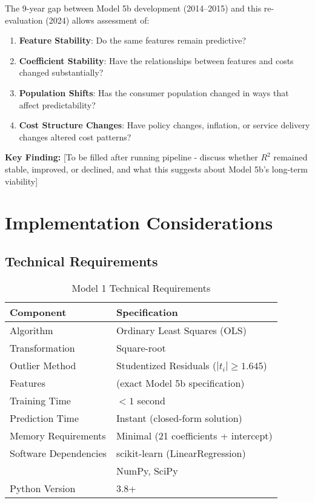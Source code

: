 The 9-year gap between Model 5b development (2014--2015) and this re-evaluation (2024) allows assessment of:

\begin{enumerate}
    \item \textbf{Feature Stability}: Do the same features remain predictive?
    \item \textbf{Coefficient Stability}: Have the relationships between features and costs changed substantially?
    \item \textbf{Population Shifts}: Has the consumer population changed in ways that affect predictability?
    \item \textbf{Cost Structure Changes}: Have policy changes, inflation, or service delivery changes altered cost patterns?
\end{enumerate}

\textbf{Key Finding:} [To be filled after running pipeline - discuss whether $R^2$ remained stable, improved, or declined, and what this suggests about Model 5b's long-term viability]

\section{Implementation Considerations}

\subsection{Technical Requirements}

\begin{table}[H]
\centering
\caption{Model 1 Technical Requirements}
\begin{tabular}{ll}
\toprule
\textbf{Component} & \textbf{Specification} \\
\midrule
Algorithm & Ordinary Least Squares (OLS) \\
Transformation & Square-root \\
Outlier Method & Studentized Residuals ($|t_i| \geq 1.645$) \\
Features & \ModelOneNumFeatures{} (exact Model 5b specification) \\
Training Time & $< 1$ second \\
Prediction Time & Instant (closed-form solution) \\
Memory Requirements & Minimal (21 coefficients + intercept) \\
\midrule
Software Dependencies & scikit-learn (LinearRegression) \\
& NumPy, SciPy \\
Python Version & 3.8+ \\
\bottomrule
\end{tabular}
\end{table}

